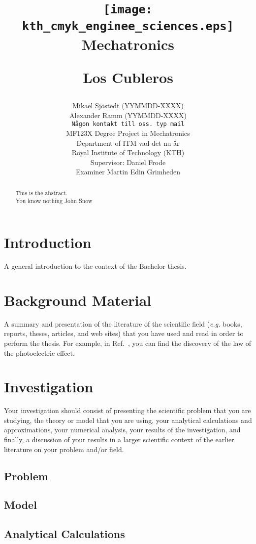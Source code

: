 \documentclass[12pt]{report}
\title{\vspace{-2.5cm}
\begin{center}
\texttt{[image: kth\_cmyk\_enginee\_sciences.eps]}\\[-1mm]
\hspace{-3mm} {\tiny {\sf Mechatronics}}
\end{center}
\vspace{5cm}
Los Cubleros}
\author{Mikael Sjöstedt (YYMMDD-XXXX) \\ Alexander Ramm (YYMMDD-XXXX)\\
{\tt Någon kontakt till oss. typ mail}\\
MF123X Degree Project in Mechatronics\\
Department of ITM vad det nu är \\
Royal Institute of Technology (KTH)\\
Supervisor: Daniel Frode \\
Examiner Martin Edin Grimheden}
\begin{document}
\maketitle

\begin{abstract}
This is the abstract. \\ You know nothing John Snow
\end{abstract}

\tableofcontents

\chapter{Introduction}

A general introduction to the context of the Bachelor thesis.

\chapter{Background Material}

A summary and presentation of the literature of the scientific field
({\it e.g.}  books, reports, theses, articles, and web sites) that you
have used and read in order to perform the thesis. For example, in
Ref.~\cite{einstein}, you can find the discovery of the law of the
photoelectric effect.

\chapter{Investigation}

Your investigation should consist of presenting the scientific problem
that you are studying, the theory or model that you are using, your
analytical calculations and approximations, your numerical analysis,
your results of the investigation, and finally, a discussion of your
results in a larger scientific context of the earlier literature on
your problem and/or field.

\section{Problem}

\section{Model}

\section{Analytical Calculations}
\end{document}
